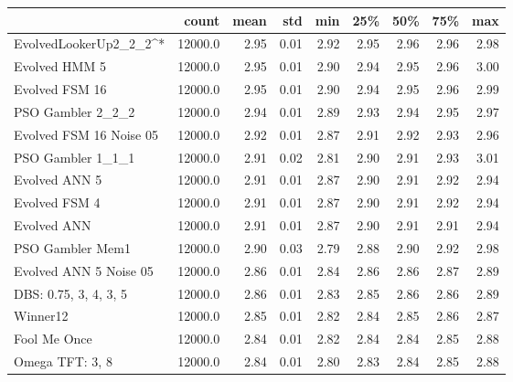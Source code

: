\begin{tabular}{lrrrrrrrr}
\toprule
{} &    count &  mean &   std &   min &   25\% &   50\% &   75\% &   max \\
\midrule
EvolvedLookerUp2\_2\_2^{*}    &  12000.0 &  2.95 &  0.01 &  2.92 &  2.95 &  2.96 &  2.96 &  2.98 \\
Evolved HMM 5           &  12000.0 &  2.95 &  0.01 &  2.90 &  2.94 &  2.95 &  2.96 &  3.00 \\
Evolved FSM 16          &  12000.0 &  2.95 &  0.01 &  2.90 &  2.94 &  2.95 &  2.96 &  2.99 \\
PSO Gambler 2\_2\_2       &  12000.0 &  2.94 &  0.01 &  2.89 &  2.93 &  2.94 &  2.95 &  2.97 \\
Evolved FSM 16 Noise 05 &  12000.0 &  2.92 &  0.01 &  2.87 &  2.91 &  2.92 &  2.93 &  2.96 \\
PSO Gambler 1\_1\_1       &  12000.0 &  2.91 &  0.02 &  2.81 &  2.90 &  2.91 &  2.93 &  3.01 \\
Evolved ANN 5           &  12000.0 &  2.91 &  0.01 &  2.87 &  2.90 &  2.91 &  2.92 &  2.94 \\
Evolved FSM 4           &  12000.0 &  2.91 &  0.01 &  2.87 &  2.90 &  2.91 &  2.92 &  2.94 \\
Evolved ANN             &  12000.0 &  2.91 &  0.01 &  2.87 &  2.90 &  2.91 &  2.91 &  2.94 \\
PSO Gambler Mem1        &  12000.0 &  2.90 &  0.03 &  2.79 &  2.88 &  2.90 &  2.92 &  2.98 \\
Evolved ANN 5 Noise 05  &  12000.0 &  2.86 &  0.01 &  2.84 &  2.86 &  2.86 &  2.87 &  2.89 \\
DBS: 0.75, 3, 4, 3, 5   &  12000.0 &  2.86 &  0.01 &  2.83 &  2.85 &  2.86 &  2.86 &  2.89 \\
Winner12                &  12000.0 &  2.85 &  0.01 &  2.82 &  2.84 &  2.85 &  2.86 &  2.87 \\
Fool Me Once            &  12000.0 &  2.84 &  0.01 &  2.82 &  2.84 &  2.84 &  2.85 &  2.88 \\
Omega TFT: 3, 8         &  12000.0 &  2.84 &  0.01 &  2.80 &  2.83 &  2.84 &  2.85 &  2.88 \\
\bottomrule
\end{tabular}
